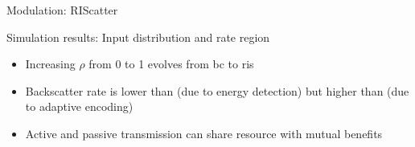 \documentclass[presentation,xcolor={table},9pt]{beamer}
\begin{document}
\begin{section}{Modulation: RIScatter}
	\begin{frame}{Simulation results: Input distribution and rate region}
		\begin{figure}[!t]
			\centering
			\subfloat{
				\resizebox{0.48\linewidth}{!}{
					
				}
			}
			\subfloat{
				\resizebox{0.48\linewidth}{!}{
					
				}
			}
		\end{figure}
		\begin{itemize}
			\item Increasing $\rho$ from 0 to 1 evolves from \gls{bc} to \gls{ris}
			\item Backscatter rate is lower than  (due to energy detection) but higher than  (due to adaptive encoding)
			\item Active and passive transmission can share resource with mutual benefits
		\end{itemize}
	\end{frame}
\end{section}
\end{document}
